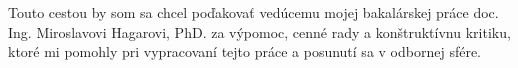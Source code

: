 Touto cestou by som sa chcel poďakovať vedúcemu mojej bakalárskej práce doc. Ing. 
Miroslavovi Hagarovi, PhD. za výpomoc, cenné rady a konštruktívnu kritiku, ktoré mi 
pomohly pri vypracovaní tejto práce a posunutí sa v odbornej sfére. 
